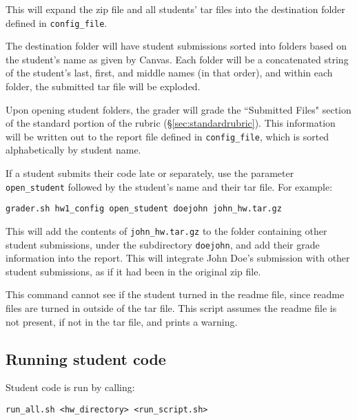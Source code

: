 \documentclass[12pt]{article}
\begin{document}
\vspace{5pt}

This will expand the zip file and all students' tar files into the destination folder defined in \texttt{config\_file}.

The destination folder will have student submissions sorted into folders based on the student's name as given by Canvas. Each folder will be a concatenated string of the student's last, first, and middle names (in that order), and within each folder, the submitted tar file will be exploded.

Upon opening student folders, the grader will grade the ``Submitted Files" section of the standard portion of the rubric (\S\ref{sec:standardrubric}). This information will be written out to the report file defined in \texttt{config\_file}, which is sorted alphabetically by student name.

If a student submits their code late or separately, use the parameter \texttt{open\_student} followed by the student's name and their tar file. For example:

\vspace{5pt}

\texttt{grader.sh hw1\_config open\_student doejohn john\_hw.tar.gz}

\vspace{5pt}

This will add the contents of \texttt{john\_hw.tar.gz} to the folder containing other student submissions, under the subdirectory \texttt{doejohn}, and add their grade information into the report. This will integrate John Doe's submission with other student submissions, as if it had been in the original zip file.

This command cannot see if the student turned in the readme file, since readme files are turned in outside of the tar file. This script assumes the readme file is not present, if not in the tar file, and prints a warning.

\vspace{5pt}

\subsection{Running student code} \label{sec:runningcode}

Student code is run by calling:

\vspace{5pt}

\noindent \texttt{run\_all.sh <hw\_directory> <run\_script.sh>}
\end{document}
